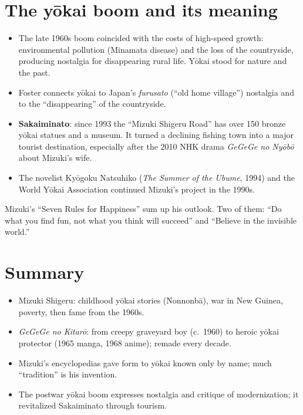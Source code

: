 \section{The yōkai boom and its meaning}

\begin{itemize}
  \item The late 1960s boom coincided with the costs of high-speed growth: environmental
        pollution (Minamata disease) and the loss of the countryside, producing nostalgia for disappearing rural life. Yōkai
        stood for nature and the past.
  \item Foster connects yōkai to Japan's \emph{furusato} (``old home village'') nostalgia
        and to the ``disappearing'' of the countryside.
  \item \textbf{Sakaiminato}: since 1993 the ``Mizuki Shigeru Road'' has over 150 bronze
        yōkai statues and a museum. It turned a declining fishing town into a major tourist
        destination, especially after the 2010 NHK drama \emph{GeGeGe no Nyōbō} about
        Mizuki's wife.
  \item The novelist Kyōgoku Natsuhiko (\emph{The Summer of the Ubume}, 1994) and the
        World Yōkai Association continued Mizuki's project in the 1990s.
\end{itemize}

\begin{aside}
Mizuki's ``Seven Rules for Happiness'' sum up his outlook. Two of them: ``Do what you
find fun, not what you think will succeed'' and ``Believe in the invisible world.''
\end{aside}

\section*{Summary}
\begin{itemize}
  \item Mizuki Shigeru: childhood yōkai stories (Nonnonbā), war in New Guinea, poverty,
        then fame from the 1960s.
  \item \emph{GeGeGe no Kitarō}: from creepy graveyard boy (c.\ 1960) to heroic yōkai protector
        (1965 manga, 1968 anime); remade every decade.
  \item Mizuki's encyclopedias gave form to yōkai known only by name; much ``tradition''
        is his invention.
  \item The postwar yōkai boom expresses nostalgia and critique of modernization; it
        revitalized Sakaiminato through tourism.
\end{itemize}
